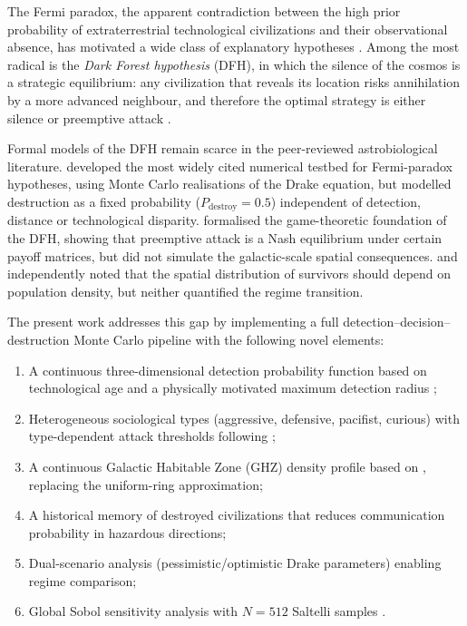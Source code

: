 \documentclass[useAMS,usenatbib]{mn2e}
\begin{document}
The Fermi paradox, the apparent contradiction between the high
prior probability of extraterrestrial technological civilizations and
their observational absence, has motivated a wide class of
explanatory hypotheses
\citep{fermi1950,hart1975,brin1983,webb2002}.
Among the most radical is the \emph{Dark Forest hypothesis} (DFH),
in which the silence of the cosmos is a strategic equilibrium: any
civilization that reveals its location risks annihilation by a more
advanced neighbour, and therefore the optimal strategy is either
silence or preemptive attack
\citep{cixin2008,devladar2013}.

Formal models of the DFH remain scarce in the peer-reviewed
astrobiological literature.
\citet{forgan2009} developed the most widely cited numerical testbed
for Fermi-paradox hypotheses, using Monte Carlo realisations of the
Drake equation, but modelled destruction as a fixed probability
($P_\text{destroy} = 0.5$) independent of detection, distance or
technological disparity.
\citet{devladar2013} formalised the game-theoretic foundation of the
DFH, showing that preemptive attack is a Nash equilibrium under
certain payoff matrices, but did not simulate the galactic-scale
spatial consequences.
\citet{foucher2023} and \citet{forgan2011} independently noted that
the spatial distribution of survivors should depend on population
density, but neither quantified the regime transition.

The present work addresses this gap by implementing a full
detection--decision--destruction Monte Carlo pipeline with the
following novel elements:
\begin{enumerate}
  \item A continuous three-dimensional detection probability function
        based on technological age and a physically motivated maximum
        detection radius \citep[$r_\text{max} = 1000$\,ly,][]{troitskij1989,
        loeb2007};
  \item Heterogeneous sociological types (aggressive, defensive,
        pacifist, curious) with type-dependent attack thresholds
        following \citet{devladar2013};
  \item A continuous Galactic Habitable Zone (GHZ) density profile
        based on \citet{lineweaver2004}, replacing the uniform-ring
        approximation;
  \item A historical memory of destroyed civilizations that reduces
        communication probability in hazardous directions;
  \item Dual-scenario analysis (pessimistic/optimistic Drake
        parameters) enabling regime comparison;
  \item Global Sobol sensitivity analysis with $N = 512$
        Saltelli samples \citep{saltelli2010}.
\end{enumerate}
\end{document}
